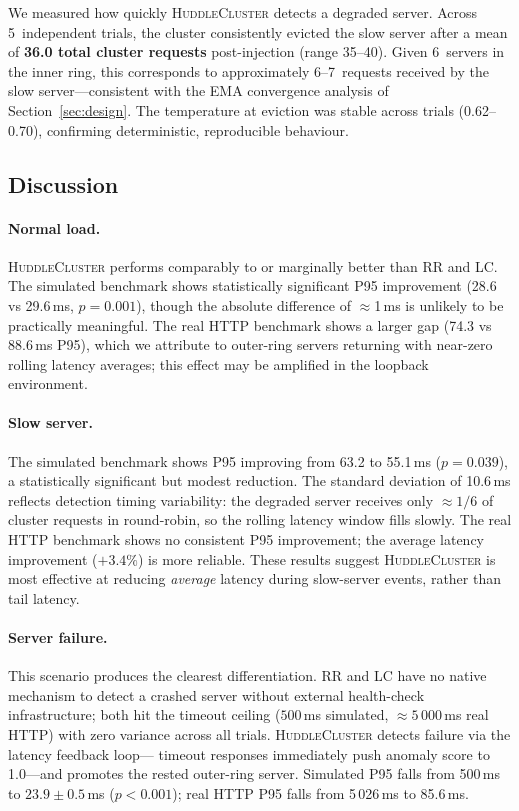 \documentclass[10pt,twocolumn]{article}
\begin{document}
We measured how quickly \textsc{HuddleCluster} detects a degraded server.
Across 5~independent trials, the cluster consistently evicted the slow
server after a mean of \textbf{36.0 total cluster requests}
post-injection (range 35--40).
Given 6~servers in the inner ring, this corresponds to approximately
6--7~requests received by the slow server---consistent with the EMA
convergence analysis of Section~\ref{sec:design}.
The temperature at eviction was stable across trials (0.62--0.70),
confirming deterministic, reproducible behaviour.

\subsection{Discussion}

\paragraph{Normal load.}
\textsc{HuddleCluster} performs comparably to or marginally better than
RR and LC\@.
The simulated benchmark shows statistically significant P95 improvement
(28.6 vs 29.6\,ms, $p=0.001$), though the absolute difference of
$\approx$1\,ms is unlikely to be practically meaningful.
The real HTTP benchmark shows a larger gap (74.3 vs 88.6\,ms P95),
which we attribute to outer-ring servers returning with near-zero rolling
latency averages; this effect may be amplified in the loopback environment.

\paragraph{Slow server.}
The simulated benchmark shows P95 improving from 63.2 to 55.1\,ms
($p=0.039$), a statistically significant but modest reduction.
The standard deviation of 10.6\,ms reflects detection timing
variability: the degraded server receives only $\approx 1/6$ of cluster
requests in round-robin, so the rolling latency window fills slowly.
The real HTTP benchmark shows no consistent P95 improvement; the
average latency improvement ($+3.4\%$) is more reliable.
These results suggest \textsc{HuddleCluster} is most effective at
reducing \emph{average} latency during slow-server events, rather than
tail latency.

\paragraph{Server failure.}
This scenario produces the clearest differentiation.
RR and LC have no native mechanism to detect a crashed server without
external health-check infrastructure; both hit the timeout ceiling
($500$\,ms simulated, $\approx 5\,000$\,ms real HTTP) with zero variance
across all trials.
\textsc{HuddleCluster} detects failure via the latency feedback loop---
timeout responses immediately push anomaly score to 1.0---and promotes
the rested outer-ring server.
Simulated P95 falls from 500\,ms to $23.9 \pm 0.5$\,ms ($p{<}0.001$);
real HTTP P95 falls from 5\,026\,ms to 85.6\,ms.
\end{document}
